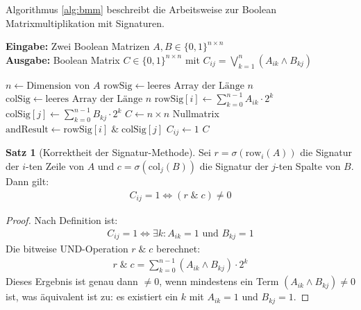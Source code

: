 ﻿\documentclass[a4paper,12pt]{article}
\theoremstyle{definition}
\newtheorem{satz}{Satz}
\begin{document}
Algorithmus \ref{alg:bmm} beschreibt die Arbeitsweise zur Boolean Matrixmultiplikation mit Signaturen.

\begin{algorithm}[htb]
	\caption{Boolean Matrixmultiplikation mit Signaturen}
	\label{alg:bmm}
	\textbf{Eingabe:} Zwei Boolean Matrizen $A, B \in \{0,1\}^{n \times n}$ \\
	\textbf{Ausgabe:} Boolean Matrix $C \in \{0,1\}^{n \times n}$ mit $C_{ij} = \bigvee_{k=1}^{n} (A_{ik} \wedge B_{kj})$
	\begin{algorithmic}[1]
		\State $n \gets \text{Dimension von } A$
		\State $\text{rowSig} \gets \text{leeres Array der Länge } n$
		\State $\text{colSig} \gets \text{leeres Array der Länge } n$
		\State $\text{rowSig}[i] \gets \sum_{k=0}^{n-1} A_{ik} \cdot 2^k$ 
		\EndFor
		\State $\text{colSig}[j] \gets \sum_{k=0}^{n-1} B_{kj} \cdot 2^k$ 
		\EndFor
		\State $C \gets n \times n$ Nullmatrix
		\State $\text{andResult} \gets \text{rowSig}[i] \; \& \; \text{colSig}[j]$ 
		\State $C_{ij} \gets 1$
		\EndIf
		\EndFor
		\EndFor    
		\State \Return $C$
	\end{algorithmic}
\end{algorithm}

\begin{satz}[Korrektheit der Signatur-Methode]
	Sei $r = \sigma(\text{row}_i(A))$ die Signatur der $i$-ten Zeile von $A$ und $c = \sigma(\text{col}_j(B))$ die Signatur der $j$-ten Spalte von $B$. Dann gilt:
	\begin{align}
		C_{ij} = 1 \Leftrightarrow (r \; \& \; c) \neq 0
	\end{align}
\end{satz}

\begin{proof}
	Nach Definition ist:
	\begin{align}
		C_{ij} = 1 \Leftrightarrow \exists k: A_{ik} = 1 \text{ und } B_{kj} = 1
	\end{align}
	Die bitweise UND-Operation $r \; \& \; c$ berechnet:
	\begin{align}
		r \; \& \; c = \sum_{k=0}^{n-1} (A_{ik} \wedge B_{kj}) \cdot 2^k
	\end{align}
	Dieses Ergebnis ist genau dann $\neq 0$, wenn mindestens ein Term $(A_{ik} \wedge B_{kj}) \neq 0$ ist, was äquivalent ist zu: es existiert ein $k$ mit $A_{ik} = 1$ und $B_{kj} = 1$.
\end{proof}
\end{document}
